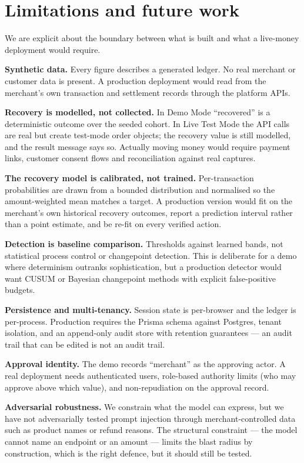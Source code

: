 \documentclass[10pt,twocolumn,a4paper]{article}
\begin{document}
\section{Limitations and future work}

We are explicit about the boundary between what is built and what a live-money
deployment would require.

\textbf{Synthetic data.} Every figure describes a generated ledger. No real
merchant or customer data is present. A production deployment would read from the
merchant's own transaction and settlement records through the platform APIs.

\textbf{Recovery is modelled, not collected.} In Demo Mode ``recovered'' is a
deterministic outcome over the seeded cohort. In Live Test Mode the API calls are
real but create test-mode order objects; the recovery value is still modelled,
and the result message says so. Actually moving money would require payment
links, customer consent flows and reconciliation against real captures.

\textbf{The recovery model is calibrated, not trained.} Per-transaction
probabilities are drawn from a bounded distribution and normalised so the
amount-weighted mean matches a target. A production version would fit on the
merchant's own historical recovery outcomes, report a prediction interval rather
than a point estimate, and be re-fit on every verified action.

\textbf{Detection is baseline comparison.} Thresholds against learned bands, not
statistical process control or changepoint detection. This is deliberate for a
demo where determinism outranks sophistication, but a production detector would
want CUSUM or Bayesian changepoint methods with explicit false-positive budgets.

\textbf{Persistence and multi-tenancy.} Session state is per-browser and the
ledger is per-process. Production requires the Prisma schema against Postgres,
tenant isolation, and an append-only audit store with retention guarantees ---
an audit trail that can be edited is not an audit trail.

\textbf{Approval identity.} The demo records ``merchant'' as the approving actor.
A real deployment needs authenticated users, role-based authority limits (who may
approve above which value), and non-repudiation on the approval record.

\textbf{Adversarial robustness.} We constrain what the model can express, but we
have not adversarially tested prompt injection through merchant-controlled data
such as product names or refund reasons. The structural constraint --- the model
cannot name an endpoint or an amount --- limits the blast radius by
construction, which is the right defence, but it should still be tested.
\end{document}
